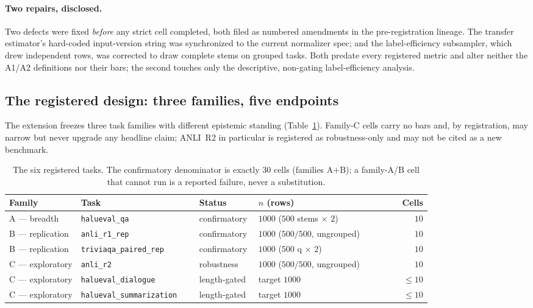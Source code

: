 \documentclass[11pt]{article}
\begin{document}
\paragraph{Two repairs, disclosed.} Two defects were fixed \emph{before} any strict cell completed,
both filed as numbered amendments in the pre-registration lineage. The transfer estimator's
hard-coded input-version string was synchronized to the current normalizer spec; and the
label-efficiency subsampler, which drew independent rows, was corrected to draw complete stems on
grouped tasks. Both predate every registered metric and alter neither the A1/A2 definitions nor their
bars; the second touches only the descriptive, non-gating label-efficiency analysis.

\subsection{The registered design: three families, five endpoints}

The extension freezes three task families with different epistemic standing (Table~\ref{tab:families}). Family-C cells carry
no bars and, by registration, may narrow but never upgrade any headline claim; ANLI~R2 in
particular is registered as robustness-only and may not be cited as a new benchmark.

\begin{table}[tbp]
\centering\small
\begin{tabular}{@{}p{0.17\linewidth}p{0.28\linewidth}p{0.14\linewidth}p{0.26\linewidth}r@{}}
\toprule
Family & Task & Status & $n$ (rows) & Cells \\
\midrule
A --- breadth      & \texttt{halueval\_qa}            & confirmatory & $1000$ ($500$ stems $\times$ $2$) & $10$ \\
B --- replication  & \texttt{anli\_r1\_rep}           & confirmatory & $1000$ ($500/500$, ungrouped)     & $10$ \\
B --- replication  & \texttt{triviaqa\_paired\_rep}   & confirmatory & $1000$ ($500$ q $\times$ $2$)     & $10$ \\
C --- exploratory  & \texttt{anli\_r2}                & robustness   & $1000$ ($500/500$, ungrouped)     & $10$ \\
C --- exploratory  & \texttt{halueval\_dialogue}      & length-gated & target $1000$                     & $\leq 10$ \\
C --- exploratory  & \texttt{halueval\_summarization} & length-gated & target $1000$                     & $\leq 10$ \\
\bottomrule
\end{tabular}
\caption{The six registered tasks. The confirmatory denominator is exactly $30$ cells (families
A$+$B); a family-A/B cell that cannot run is a reported failure, never a substitution.}
\label{tab:families}
\end{table}
\end{document}
